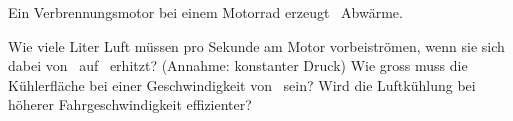 Ein Verbrennungsmotor bei einem Motorrad erzeugt \PAO\ Abwärme.
\begin{abcliste}
\abc Wie viele Liter Luft müssen pro Sekunde am Motor vorbeiströmen, wenn sie sich dabei von \TaO\ auf \TbO\ erhitzt? (Annahme: konstanter Druck)
\abc Wie gross muss die Kühlerfläche bei einer Geschwindigkeit von \vLO\ sein?
\abc Wird die Luftkühlung bei höherer Fahrgeschwindigkeit effizienter?
\end{abcliste}
